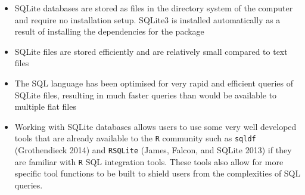 \documentclass[]{article}
\begin{document}
\begin{itemize}
\itemsep1pt\parskip0pt
\item
  SQLite databases are stored as files in the directory system of the
  computer and require no installation setup. SQLite3 is installed
  automatically as a result of installing the dependencies for the
  package
\item
  SQLite files are stored efficiently and are relatively small compared
  to text files
\item
  The SQL language has been optimised for very rapid and efficient
  queries of SQLite files, resulting in much faster queries than would
  be available to multiple flat files
\item
  Working with SQLite databases allows users to use some very well
  developed tools that are already available to the \texttt{R} community
  such as \texttt{sqldf} (Grothendieck 2014) and \texttt{RSQLite}
  (James, Falcon, and SQLite 2013) if they are familiar with \texttt{R}
  SQL integration tools. These tools also allow for more specific tool
  functions to be built to shield users from the complexities of SQL
  queries.
\end{itemize}
\end{document}
